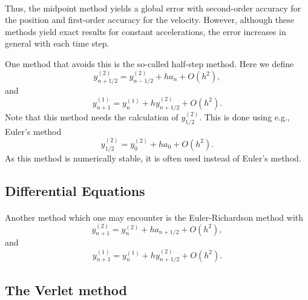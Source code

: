 \documentclass[%
oneside,                 %
final,                   %
10pt]{article}
\begin{document}
\paragraph{}
Thus, the midpoint method yields a global error with 
second-order accuracy for
the position and first-order accuracy for the velocity. However, although these methods yield exact results for
constant accelerations, the error increases in general with each time step.

One method that avoids this is the so-called half-step method. Here we define
\begin{equation}
   y^{(2)}_{n+1/2}=y^{(2)}_{n-1/2}+h a_{n}+O(h^2),
\end{equation}
and 
\begin{equation}
   y^{(1)}_{n+1}=y^{(1)}_{n}+hy^{(2)}_{n+1/2} +O(h^2).
\end{equation}
Note that this method needs the calculation of $y^{(2)}_{1/2}$. This is done using 
e.g., Euler's method
\begin{equation}
   y^{(2)}_{1/2}=y^{(2)}_{0}+h a_{0}+O(h^2).
\end{equation}
As this method is numerically stable, it is often used instead of Euler's method.




\subsection*{Differential Equations}

\paragraph{}
Another method which one may encounter is the Euler-Richardson method
with
\begin{equation}
   y^{(2)}_{n+1}=y^{(2)}_{n}+h a_{n+1/2}+O(h^2),
   \label{eq:er1}
\end{equation}
and 
\begin{equation}
   \label{eq:er2}
   y^{(1)}_{n+1}=y^{(1)}_{n}+hy^{(2)}_{n+1/2} +O(h^2).
\end{equation}



\subsection*{The Verlet method}
\end{document}
